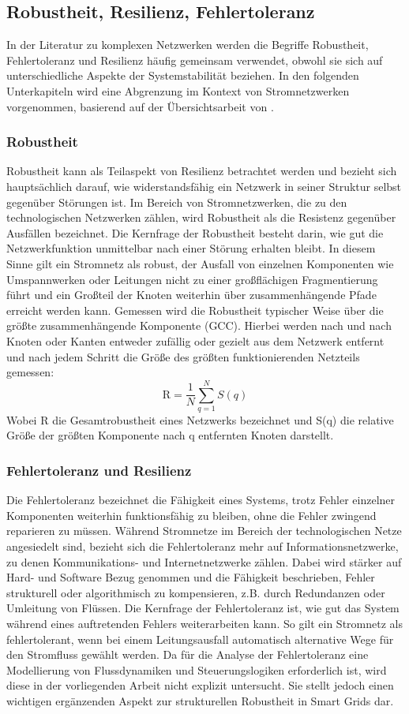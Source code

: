 \documentclass[14pt,a4paper]{scrartcl}
\begin{document}
\subsection{Robustheit, Resilienz, Fehlertoleranz}
In der Literatur zu komplexen Netzwerken werden die Begriffe Robustheit, Fehlertoleranz und Resilienz häufig gemeinsam verwendet, obwohl sie sich auf unterschiedliche Aspekte der Systemstabilität beziehen. In den folgenden Unterkapiteln wird eine Abgrenzung im Kontext von Stromnetzwerken vorgenommen, basierend auf der Übersichtsarbeit von \cite{Qi2024}. 
\subsubsection{Robustheit}
Robustheit kann als Teilaspekt von Resilienz betrachtet werden  und bezieht sich hauptsächlich darauf, wie widerstandsfähig ein Netzwerk in seiner Struktur selbst gegenüber Störungen ist. Im Bereich von Stromnetzwerken, die zu den technologischen Netzwerken zählen, wird Robustheit als die Resistenz gegenüber Ausfällen bezeichnet. Die Kernfrage der Robustheit besteht darin, wie gut die Netzwerkfunktion unmittelbar nach einer Störung erhalten bleibt. In diesem Sinne gilt ein Stromnetz als robust, der Ausfall von einzelnen Komponenten wie Umspannwerken oder Leitungen nicht zu einer großflächigen Fragmentierung führt und ein Großteil der Knoten weiterhin über zusammenhängende Pfade erreicht werden kann. 
Gemessen wird die Robustheit typischer Weise über die größte zusammenhängende Komponente (GCC). Hierbei werden nach und nach Knoten oder Kanten entweder zufällig oder gezielt aus dem Netzwerk entfernt und nach jedem Schritt die Größe des größten funktionierenden Netzteils gemessen: 
\[
\mathrm{R} = \frac{1}{N} \sum_{q=1}^{N} S(q)
\]
Wobei R die Gesamtrobustheit eines Netzwerks bezeichnet und S(q) die relative Größe der größten Komponente nach q entfernten Knoten darstellt. 

\subsubsection{Fehlertoleranz und Resilienz}
Die Fehlertoleranz bezeichnet die Fähigkeit eines Systems, trotz Fehler einzelner Komponenten weiterhin funktionsfähig zu bleiben, ohne die Fehler zwingend reparieren zu müssen. Während Stromnetze im Bereich der technologischen Netze angesiedelt sind, bezieht sich die Fehlertoleranz mehr auf Informationsnetzwerke, zu denen Kommunikations- und Internetnetzwerke zählen. Dabei wird stärker auf Hard- und Software Bezug genommen und die Fähigkeit beschrieben, Fehler strukturell oder algorithmisch zu kompensieren, z.B. durch Redundanzen oder Umleitung von Flüssen. Die Kernfrage der Fehlertoleranz ist, wie gut das System während eines auftretenden Fehlers weiterarbeiten kann. So gilt ein Stromnetz als fehlertolerant, wenn bei einem Leitungsausfall automatisch alternative Wege für den Stromfluss gewählt werden. 
Da für die Analyse der Fehlertoleranz eine Modellierung von Flussdynamiken und Steuerungslogiken erforderlich ist, wird diese in der vorliegenden Arbeit nicht explizit untersucht. Sie stellt jedoch einen wichtigen ergänzenden Aspekt zur strukturellen Robustheit in Smart Grids dar. 
\end{document}
